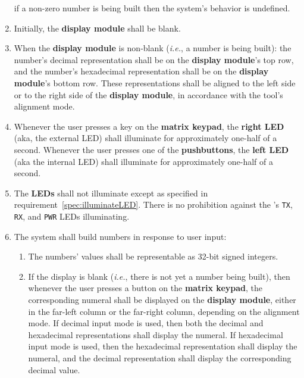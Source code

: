 \begin{enumerate}
        if a non-zero number is being built then the system's behavior is undefined.
    \item Initially, the \textbf{display module} shall be blank.
    \item \label{spec:displayFormat} When the \textbf{display module} is non-blank (\textit{i.e.}, a number is being built):
        the number's decimal representation shall be on the \textbf{display module}'s top row,
        and the number's hexadecimal representation shall be on the \textbf{display module}'s bottom row.
        These representations shall be aligned to the left side or to the right side of the \textbf{display module}, in accordance with the tool's alignment mode.
    \item \label{spec:illuminateLED} Whenever the user presses a key on the \textbf{matrix keypad}, the \textbf{right LED} (aka, the external LED) shall illuminate for approximately one-half of a second.
        Whenever the user presses one of the \textbf{pushbuttons}, the \textbf{left LED} (aka the internal LED) shall illuminate for approximately one-half of a second.
    \item \label{spec:LEDoffWhenOtherwise} The \textbf{LEDs} shall not illuminate except as specified in requirement~\ref{spec:illuminateLED}.
        There is no prohibition against the \developmentboard's \texttt{TX}, \texttt{RX}, and \texttt{PWR} LEDs illuminating.
    \item The system shall build numbers in response to user input:
        \begin{enumerate}
        \item \label{spec:32bits} The numbers' values shall be representable as 32-bit signed integers.
        \item \label{spec:initialKeyPress} If the display is blank (\textit{i.e.}, there is not yet a number being built), then whenever the user presses a button on the \textbf{matrix keypad}, the corresponding numeral shall be displayed on the \textbf{display module}, either in the far-left column or the far-right column, depending on the alignment mode.
            If decimal input mode is used, then both the decimal and hexadecimal representations shall display the numeral.
            If hexadecimal input mode is used, then the hexadecimal representation shall display the numeral,
            and the decimal representation shall display the corresponding decimal value.

\end{enumerate}
\end{enumerate}

